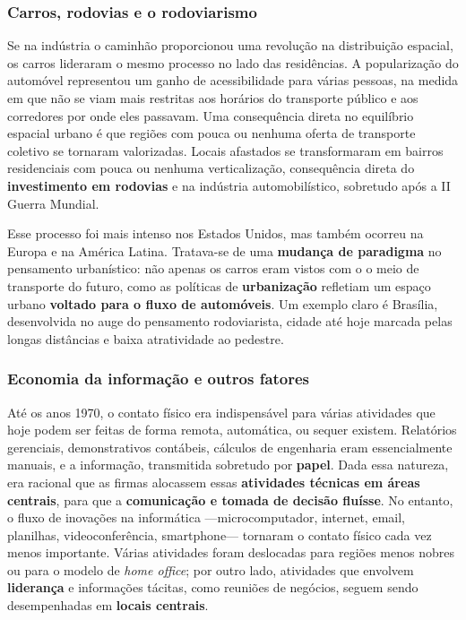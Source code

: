 \documentclass[
  12pt,
  a4paper,
]{article}
\begin{document}
\hypertarget{carros-rodovias-e-o-rodoviarismo}{%
\subsubsection{Carros, rodovias e o
rodoviarismo}\label{carros-rodovias-e-o-rodoviarismo}}

Se na indústria o caminhão proporcionou uma revolução na distribuição
espacial, os carros lideraram o mesmo processo no lado das residências.
A popularização do automóvel representou um ganho de acessibilidade para
várias pessoas, na medida em que não se viam mais restritas aos horários
do transporte público e aos corredores por onde eles passavam. Uma
consequência direta no equilíbrio espacial urbano é que regiões com
pouca ou nenhuma oferta de transporte coletivo se tornaram valorizadas.
Locais afastados se transformaram em bairros residenciais com pouca ou
nenhuma verticalização, consequência direta do \textbf{investimento em
rodovias} e na indústria automobilístico, sobretudo após a II Guerra
Mundial.

Esse processo foi mais intenso nos Estados Unidos, mas também ocorreu na
Europa e na América Latina. Tratava-se de uma \textbf{mudança de
paradigma} no pensamento urbanístico: não apenas os carros eram vistos
com o o meio de transporte do futuro, como as políticas de
\textbf{urbanização} refletiam um espaço urbano \textbf{voltado para o
fluxo de automóveis}. Um exemplo claro é Brasília, desenvolvida no auge
do pensamento rodoviarista, cidade até hoje marcada pelas longas
distâncias e baixa atratividade ao pedestre.

\hypertarget{economia-da-informauxe7uxe3o-e-outros-fatores}{%
\subsubsection{Economia da informação e outros
fatores}\label{economia-da-informauxe7uxe3o-e-outros-fatores}}

Até os anos 1970, o contato físico era indispensável para várias
atividades que hoje podem ser feitas de forma remota, automática, ou
sequer existem. Relatórios gerenciais, demonstrativos contábeis,
cálculos de engenharia eram essencialmente manuais, e a informação,
transmitida sobretudo por \textbf{papel}. Dada essa natureza, era
racional que as firmas alocassem essas \textbf{atividades técnicas em
áreas centrais}, para que a \textbf{comunicação e tomada de decisão
fluísse}. No entanto, o fluxo de inovações na informática
---microcomputador, internet, email, planilhas, videoconferência,
smartphone--- tornaram o contato físico cada vez menos importante.
Várias atividades foram deslocadas para regiões menos nobres ou para o
modelo de \emph{home office}; por outro lado, atividades que envolvem
\textbf{liderança} e informações tácitas, como reuniões de negócios,
seguem sendo desempenhadas em \textbf{locais centrais}.
\end{document}
